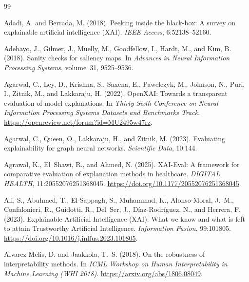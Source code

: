 \documentclass[twoside,11pt]{article}
\begin{document}
\clearpage
{}
{}
\begin{thebibliography}{99}

Adadi, A. and Berrada, M. (2018).
Peeking inside the black-box: A survey on explainable artificial
intelligence (XAI).
\emph{IEEE Access}, 6:52138--52160.

Adebayo, J., Gilmer, J., Muelly, M., Goodfellow, I., Hardt, M., and Kim, B.
(2018).
Sanity checks for saliency maps.
In \emph{Advances in Neural Information Processing Systems}, volume~31,
9525--9536.

Agarwal, C., Ley, D., Krishna, S., Saxena, E., Pawelczyk, M., Johnson, N.,
Puri, I., Zitnik, M., and Lakkaraju, H. (2022).
OpenXAI: Towards a transparent evaluation of model explanations.
In \emph{Thirty-Sixth Conference on Neural Information Processing Systems
Datasets and Benchmarks Track}.
\url{https://openreview.net/forum?id=MU2495w47rz}.

Agarwal, C., Queen, O., Lakkaraju, H., and Zitnik, M. (2023).
Evaluating explainability for graph neural networks.
\emph{Scientific Data}, 10:144.

Agrawal, K., El~Shawi, R., and Ahmed, N. (2025).
XAI-Eval: A framework for comparative evaluation of explanation methods
in healthcare.
\emph{DIGITAL HEALTH}, 11:20552076251368045.
\url{https://doi.org/10.1177/20552076251368045}.

Ali, S., Abuhmed, T., El-Sappagh, S., Muhammad, K., Alonso-Moral, J.~M.,
Confalonieri, R., Guidotti, R., Del~Ser, J., D\'{i}az-Rodr\'{i}guez, N.,
and Herrera, F. (2023).
Explainable Artificial Intelligence (XAI): What we know and what is left
to attain Trustworthy Artificial Intelligence.
\emph{Information Fusion}, 99:101805.
\url{https://doi.org/10.1016/j.inffus.2023.101805}.

Alvarez-Melis, D. and Jaakkola, T.~S. (2018).
On the robustness of interpretability methods.
In \emph{ICML Workshop on Human Interpretability in Machine Learning
(WHI 2018)}.
\url{https://arxiv.org/abs/1806.08049}.


\end{thebibliography}
\end{document}
